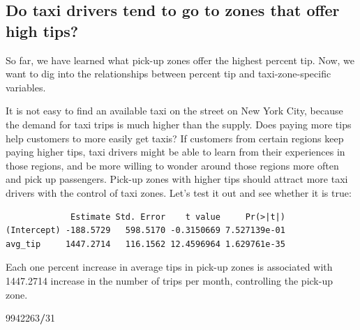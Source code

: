 \documentclass[12pt,twoside]{reedthesis}
\newenvironment{Shaded}{\begin{snugshade}}{\end{snugshade}}
\newcommand{\KeywordTok}[1]{\textcolor[rgb]{0.13,0.29,0.53}{\textbf{#1}}}
\newcommand{\DataTypeTok}[1]{\textcolor[rgb]{0.13,0.29,0.53}{#1}}
\newcommand{\DecValTok}[1]{\textcolor[rgb]{0.00,0.00,0.81}{#1}}
\newcommand{\StringTok}[1]{\textcolor[rgb]{0.31,0.60,0.02}{#1}}
\newcommand{\CommentTok}[1]{\textcolor[rgb]{0.56,0.35,0.01}{\textit{#1}}}
\newcommand{\OperatorTok}[1]{\textcolor[rgb]{0.81,0.36,0.00}{\textbf{#1}}}
\newcommand{\NormalTok}[1]{#1}
\theoremstyle{definition}
\theoremstyle{definition}
\theoremstyle{definition}
\theoremstyle{remark}
\begin{document}
\subsection{Do taxi drivers tend to go to zones that offer high
tips?}\label{do-taxi-drivers-tend-to-go-to-zones-that-offer-high-tips}

So far, we have learned what pick-up zones offer the highest percent
tip. Now, we want to dig into the relationships between percent tip and
taxi-zone-specific variables.

It is not easy to find an available taxi on the street on New York City,
because the demand for taxi trips is much higher than the supply. Does
paying more tips help customers to more easily get taxis? If customers
from certain regions keep paying higher tips, taxi drivers might be able
to learn from their experiences in those regions, and be more willing to
wonder around those regions more often and pick up passengers. Pick-up
zones with higher tips should attract more taxi drivers with the control
of taxi zones. Let's test it out and see whether it is true:
\begin{Shaded}
\end{Shaded}
\begin{verbatim}
             Estimate Std. Error    t value     Pr(>|t|)
(Intercept) -188.5729   598.5170 -0.3150669 7.527139e-01
avg_tip     1447.2714   116.1562 12.4596964 1.629761e-35
\end{verbatim}
Each one percent increase in average tips in pick-up zones is associated
with 1447.2714 increase in the number of trips per month, controlling
the pick-up zone.
\begin{Shaded}
\begin{Highlighting}[]
\DecValTok{9942263}\OperatorTok{/}\DecValTok{31}
\end{Highlighting}
\end{Shaded}
\end{document}

